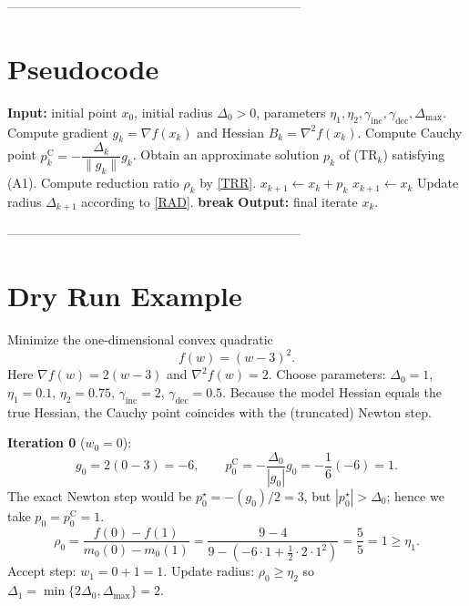\documentclass{article}
\begin{document}
---------------------------------------------------------------------

\section*{Pseudocode}
\begin{algorithm}[H]
\caption{Convex Trust‑Region Method (CTR)}\label{alg:ctr}
\begin{algorithmic}[1]
\State \textbf{Input:} initial point \(x_0\), initial radius \(\Delta_0>0\),
       parameters \(\eta_1,\eta_2,\gamma_{\text{inc}},\gamma_{\text{dec}},\Delta_{\max}\).
    \State Compute gradient \(g_k=\nabla f(x_k)\) and Hessian \(B_k=\nabla^2 f(x_k)\).
    \State Compute Cauchy point \(p_k^{\text{C}}=-\dfrac{\Delta_k}{\|g_k\|}g_k\).
    \State Obtain an approximate solution \(p_k\) of (TR$_k$) satisfying (A1).
    \State Compute reduction ratio \(\rho_k\) by \eqref{TRR}.
        \State $x_{k+1}\gets x_k+p_k$ 
    \Else
        \State $x_{k+1}\gets x_k$ 
    \EndIf
    \State Update radius \(\Delta_{k+1}\) according to \eqref{RAD}.
        \State \textbf{break}
    \EndIf
\EndFor
\State \textbf{Output:} final iterate \(x_k\).
\end{algorithmic}
\end{algorithm}

---------------------------------------------------------------------

\section*{Dry Run Example}
Minimize the one‑dimensional convex quadratic
\[
f(w)=(w-3)^2 .
\]
Here \(\nabla f(w)=2(w-3)\) and \(\nabla^2 f(w)=2\).  
Choose parameters:
\(\Delta_0=1\), \(\eta_1=0.1\), \(\eta_2=0.75\),
\(\gamma_{\text{inc}}=2\), \(\gamma_{\text{dec}}=0.5\).
Because the model Hessian equals the true Hessian, the Cauchy point coincides with the
(truncated) Newton step.

\medskip
\noindent\textbf{Iteration 0} (\(w_0=0\)):
\[
g_0=2(0-3)=-6,\qquad p_0^{\text{C}}=-\frac{\Delta_0}{|g_0|}g_0
 =-\frac{1}{6}(-6)=1 .
\]
The exact Newton step would be \(p^{\star}_0=-(g_0)/2=3\), but \(|p^{\star}_0|>\Delta_0\);
hence we take \(p_0=p_0^{\text{C}}=1\).
\[
\rho_0=\frac{f(0)-f(1)}{m_0(0)-m_0(1)}
 =\frac{9-4}{9-( -6\cdot1+\tfrac12\cdot2\cdot1^2)}=\frac{5}{5}=1\ge\eta_1 .
\]
Accept step: \(w_1=0+1=1\).  
Update radius: \(\rho_0\ge\eta_2\) so \(\Delta_1=\min\{2\Delta_0,\Delta_{\max}\}=2\).
\end{document}
